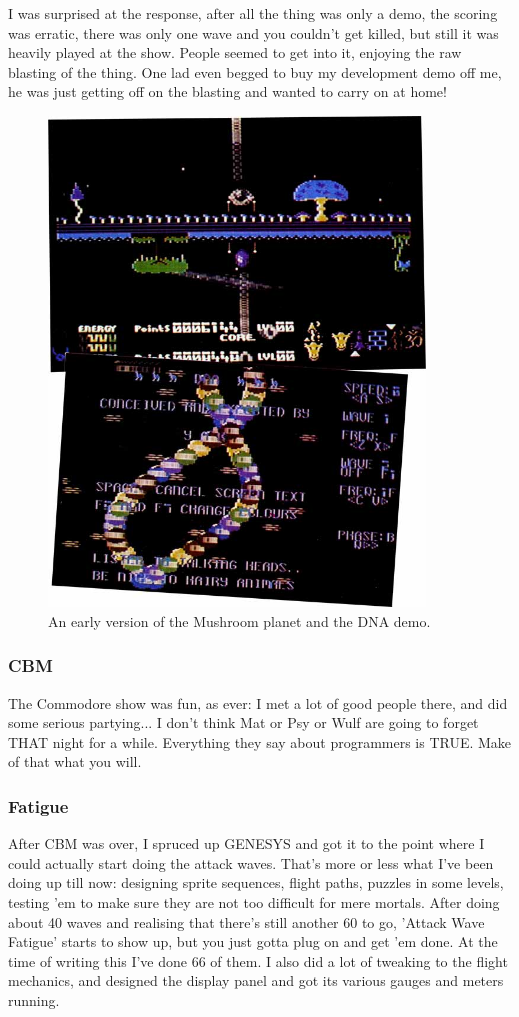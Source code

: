 I was surprised at the response, after all the thing was only a demo, the scoring was erratic, there was only one wave and you couldn't get killed, but still it was heavily played at the show. People seemed to get into it, enjoying the raw blasting of the thing. One lad even begged to buy my development demo off me, he was just getting off on the blasting and wanted to carry on at home!

\begin{figure}[H]
    \centering
      \includegraphics[width=10cm]{src/diary/zzap16_pic1.jpg}%
\caption{An early version of the Mushroom planet and the DNA demo.}
\end{figure}

\subsubsection{CBM}
The Commodore show was fun, as ever: I met a lot of good people there, and did some serious partying... I don't think Mat or Psy or Wulf are going to forget THAT night for a while. Everything they say about programmers is TRUE. Make of that what you will.

\subsubsection{Fatigue}
After CBM was over, I spruced up GENESYS and got it to the point where I could actually start doing the attack waves. That's more or less what I've been doing up till now: designing sprite sequences, flight paths, puzzles in some levels, testing 'em to make sure they are not too difficult for mere mortals. After doing about 40 waves and realising that there's still another 60 to go, 'Attack Wave Fatigue' starts to show up, but you just gotta plug on and get 'em done. At the time of writing this I've done 66 of them. I also did a lot of tweaking to the flight mechanics, and designed the display panel and got its various gauges and meters running.

